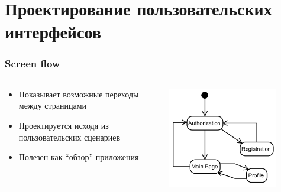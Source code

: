 \documentclass[xetex,mathserif,serif]{beamer}
\begin{document}
	\section{Проектирование пользовательских интерфейсов}

	\begin{frame}
		\frametitle{Screen flow}
		\begin{columns}
			\begin{column}{0.6\textwidth}
				\begin{itemize}
					\item Показывает возможные переходы между страницами
					\item Проектируется исходя из пользовательских сценариев
					\item Полезен как ``обзор'' приложения
				\end{itemize}
			\end{column}
			\begin{column}{0.4\textwidth}
				\begin{center}
					\includegraphics[width=0.8\textwidth]{screenFlow.png}
				\end{center}
			\end{column}
		\end{columns}
	\end{frame}
\end{document}
